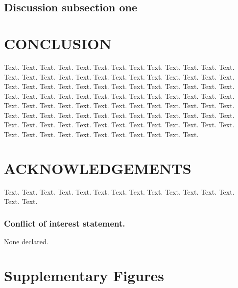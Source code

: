 \documentclass[a4,center,fleqn]{NAR}
\begin{document}
\subsection{Discussion subsection one}



\section{CONCLUSION}

Text. Text. Text. Text. Text. Text. Text. Text. Text. Text. Text.
Text. Text. Text. Text. Text. Text. Text. Text. Text. Text. Text.
Text. Text. Text. Text. Text. Text. Text. Text. Text. Text. Text.
Text. Text. Text. Text. Text. Text. Text. Text. Text. Text. Text.
Text. Text. Text. Text. Text. Text. Text. Text. Text. Text. Text.
Text. Text. Text. Text. Text. Text. Text. Text. Text. Text. Text.
Text. Text. Text. Text. Text. Text. Text. Text. Text. Text. Text.
Text. Text. Text. Text. Text. Text. Text. Text. Text. Text. Text.
Text. Text. Text. Text. Text. Text. Text. Text. Text. Text. Text.
Text. Text. Text.


\section{ACKNOWLEDGEMENTS}

Text. Text. Text. Text. Text. Text. Text. Text. Text. Text. Text.
Text. Text. Text. Text.


\subsubsection{Conflict of interest statement.} None declared.






\section{Supplementary Figures}
\end{document}
